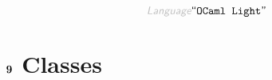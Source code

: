\begin{displaymath}
\KEY{Language} \STRING{OCaml Light}
\end{displaymath}

\section*{$\SECT{9}$ Classes}\hypertarget{sect9-classes}{}\label{sect9-classes}

